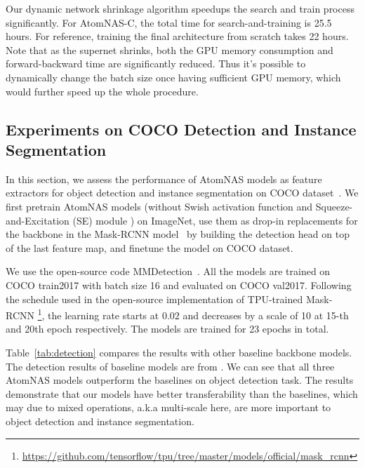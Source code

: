 \documentclass{article} \usepackage{iclr2020_conference,times}
\begin{document}
Our dynamic network shrinkage algorithm speedups the search and train process significantly. For AtomNAS-C, the total time for search-and-training is 25.5 hours. For reference, training the final architecture from scratch takes 22 hours.
Note that as the supernet shrinks, both the GPU memory consumption and forward-backward time are significantly reduced. Thus it's possible to dynamically change the batch size once having sufficient GPU memory, which would further speed up the whole procedure. 


\subsection{Experiments on COCO Detection and Instance Segmentation}
\label{sub:exp_coco}

In this section, we assess the performance of AtomNAS models as feature extractors for object detection and instance segmentation on COCO dataset~\citep{lin2014mscoco}. We first pretrain AtomNAS models (without Swish activation function \citep{ramachandran2018swish} and Squeeze-and-Excitation (SE) module \citep{hu2018se}) on ImageNet, use them as drop-in replacements for the backbone in the Mask-RCNN model~\citep{he2017maskrcnn} by building the detection head on top of the last feature map, and finetune the model on COCO dataset.

We use the open-source code MMDetection~\citep{kai2019mmdetection}. All the models are trained on COCO train2017 with batch size 16 and evaluated on COCO val2017. Following the schedule used in the open-source implementation of TPU-trained
Mask-RCNN \footnote{\url{https://github.com/tensorflow/tpu/tree/master/models/official/mask_rcnn}}, the learning rate starts at $0.02$ and decreases by a scale of 10 at 15-th and 20th epoch respectively. The models are trained for 23 epochs in total.

Table~\ref{tab:detection} compares the results with other baseline backbone models. The detection results of baseline models are from \cite{stamoulis2019single_path_automl}. We can see that all three AtomNAS models outperform the baselines on object detection task. The results demonstrate that our models have better transferability than the baselines, which may due to mixed operations, a.k.a multi-scale here, are more important to object detection and instance segmentation.
\end{document}
